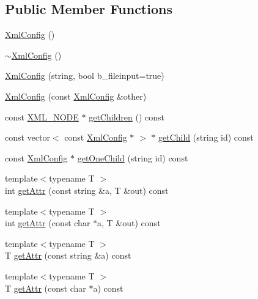 \subsection*{Public Member Functions}
\begin{DoxyCompactItemize}
\item 
\mbox{\hyperlink{classgraphsat_1_1_xml_config_a3802c73c91349608b948c7333dfc35e4}{Xml\+Config}} ()
\item 
\mbox{\hyperlink{classgraphsat_1_1_xml_config_afdfd5e55bb1e70ec966878029e187c39}{$\sim$\+Xml\+Config}} ()
\item 
\mbox{\hyperlink{classgraphsat_1_1_xml_config_a04abb18c768bc955d4698bcb048e3686}{Xml\+Config}} (string, bool b\+\_\+fileinput=true)
\item 
\mbox{\hyperlink{classgraphsat_1_1_xml_config_a6fa611a449d884f2437145b0e5680cd0}{Xml\+Config}} (const \mbox{\hyperlink{classgraphsat_1_1_xml_config}{Xml\+Config}} \&other)
\item 
const \mbox{\hyperlink{namespacegraphsat_a8b991d53e7169027cb0197e267a5915b}{X\+M\+L\+\_\+\+N\+O\+DE}} $\ast$ \mbox{\hyperlink{classgraphsat_1_1_xml_config_ab5960dd0175af1434fedc80d43f3dcf6}{get\+Children}} () const
\item 
const vector$<$ const \mbox{\hyperlink{classgraphsat_1_1_xml_config}{Xml\+Config}} $\ast$ $>$ $\ast$ \mbox{\hyperlink{classgraphsat_1_1_xml_config_a7db6e5780e6eecff5c904b909eaefe22}{get\+Child}} (string id) const
\item 
const \mbox{\hyperlink{classgraphsat_1_1_xml_config}{Xml\+Config}} $\ast$ \mbox{\hyperlink{classgraphsat_1_1_xml_config_afcc69a80121ee6d026c5da49defb566b}{get\+One\+Child}} (string id) const
\item 
{\footnotesize template$<$typename T $>$ }\\int \mbox{\hyperlink{classgraphsat_1_1_xml_config_a348451001c3d7c1f842fc77ad82cef81}{get\+Attr}} (const string \&a, T \&out) const
\item 
{\footnotesize template$<$typename T $>$ }\\int \mbox{\hyperlink{classgraphsat_1_1_xml_config_af84cfca495ac2835dd7f4d196c80b6cb}{get\+Attr}} (const char $\ast$a, T \&out) const
\item 
{\footnotesize template$<$typename T $>$ }\\T \mbox{\hyperlink{classgraphsat_1_1_xml_config_a3ac85be6da0905da1e133d519c7e589c}{get\+Attr}} (const string \&a) const
\item 
{\footnotesize template$<$typename T $>$ }\\T \mbox{\hyperlink{classgraphsat_1_1_xml_config_a27d2882599e816fc2d3b3237689c2b02}{get\+Attr}} (const char $\ast$a) const

\end{DoxyCompactItemize}
